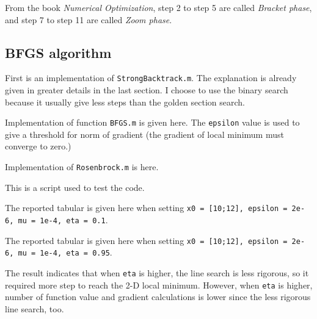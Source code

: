 \documentclass{article}
\begin{document}
From the book \emph{Numerical Optimization}, step 2 to step 5 are called \emph{Bracket phase}, and step 7 to step 11 are called \emph{Zoom phase}.

\subsection*{BFGS algorithm}

First is an implementation of \lstinline{StrongBacktrack.m}. The explanation is already given in greater details in the last section. I choose to use the binary search because it usually give less steps than the golden section search.



Implementation of function \lstinline{BFGS.m} is given here. The \lstinline{epsilon} value is used to give a threshold for norm of gradient (the gradient of local minimum must converge to zero.)



Implementation of \lstinline{Rosenbrock.m} is here.



This is a script used to test the code.



The reported tabular is given here when setting \lstinline{x0 = [10;12], epsilon = 2e-6, mu = 1e-4, eta = 0.1}.



The reported tabular is given here when setting \lstinline{x0 = [10;12], epsilon = 2e-6, mu = 1e-4, eta = 0.95}.



The result indicates that when \lstinline{eta} is higher, the line search is less rigorous, so it required more step to reach the 2-D local minimum. However, when \lstinline{eta} is higher, number of function value and gradient calculations is lower since the less rigorous line search, too.
\end{document}
